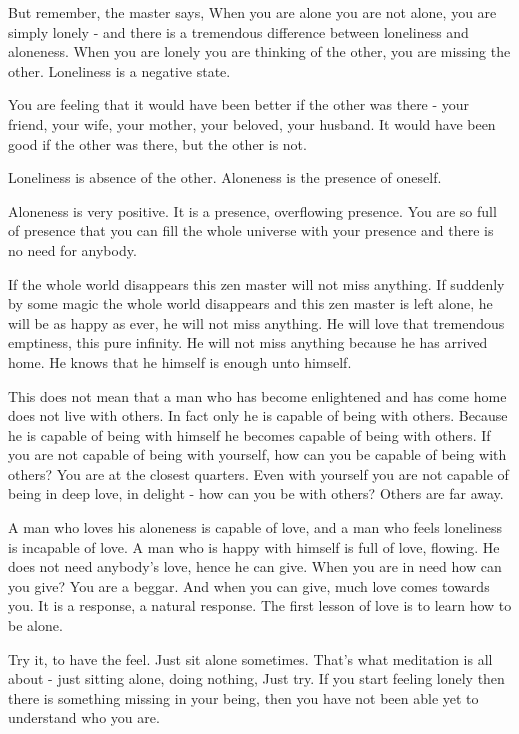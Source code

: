 But remember, the master says,  When you are alone you are not alone, you are simply lonely - and there is a tremendous difference between loneliness and aloneness. When you are lonely you are thinking of the other, you are missing the other. Loneliness is a negative state. 

You are feeling that it would have been better if the other was there - your friend, your wife, your mother, your beloved, your husband. It would have been good if the other was there, but the other is not. 

Loneliness is absence of the other. Aloneness is the presence of oneself. 

Aloneness is very positive. It is a presence, overflowing presence. You are so full of presence that you can fill the whole universe with your presence and there is no need for anybody. 

If the whole world disappears this zen master will not miss anything. If suddenly by some magic the whole world disappears and this zen master is left alone, he will be as happy as ever, he will not miss anything. He will love that tremendous emptiness, this pure infinity. He will not miss anything because he has arrived home. He knows that he himself is enough unto himself. 

This does not mean that a man who has become enlightened and has come home does not live with others. In fact only he is capable of being with others. Because he is capable of being with himself he becomes capable of being with others. If you are not capable of being with yourself, how can you be capable of being with others? You are at the closest quarters. Even with yourself you are not capable of being in deep love, in delight - how can you be with others? Others are far away. 

A man who loves his aloneness is capable of love, and a man who feels loneliness is incapable of love. A man who is happy with himself is full of love, flowing. He does not need anybody's love, hence he can give. When you are in need how can you give? You are a beggar. And when you can give, much love comes towards you. It is a response, a natural response. The first lesson of love is to learn how to be alone. 

Try it, to have the feel. Just sit alone sometimes. That's what meditation is all about - just sitting alone, doing nothing, Just try. If you start feeling lonely then there is something missing in your being, then you have not been able yet to understand who you are. 

